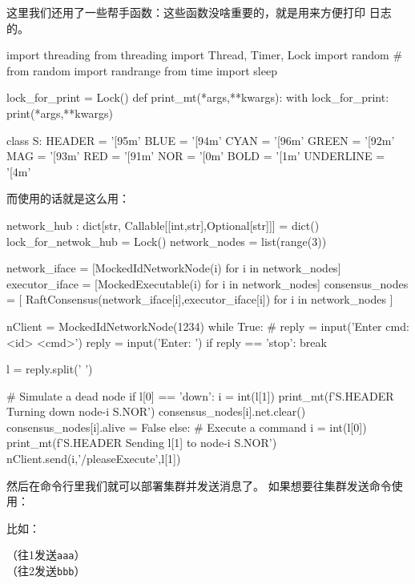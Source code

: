 \begin{tcolorbox}
   这里我们还用了一些帮手函数：这些函数没啥重要的，就是用来方便打印
  日志的。
  \begin{simplepy}
import threading
from threading import Thread, Timer, Lock
import random
# from random import randrange
from time import sleep

lock_for_print = Lock()
def print_mt(*args,**kwargs):
    with lock_for_print:
        print(*args,**kwargs)

class S:
    HEADER = '[95m'
    BLUE = '[94m'
    CYAN = '[96m'
    GREEN = '[92m'
    MAG = '[93m'
    RED = '[91m'
    NOR = '[0m'
    BOLD = '[1m'
    UNDERLINE = '[4m'
  \end{simplepy}
\end{tcolorbox}
而使用的话就是这么用：
\begin{simplepy}
network_hub : dict[str, Callable[[int,str],Optional[str]]] = dict()
lock_for_netwok_hub = Lock()
network_nodes = list(range(3))

network_iface = [MockedIdNetworkNode(i) for i in network_nodes]
executor_iface = [MockedExecutable(i) for i in network_nodes]
consensus_nodes = [
    RaftConsensus(network_iface[i],executor_iface[i]) for i in network_nodes
]

nClient = MockedIdNetworkNode(1234)
while True:
    # reply = input('Enter cmd: <id> <cmd>')
    reply = input('Enter: ')
    if reply == 'stop': break

    l = reply.split(' ')

    # Simulate a dead node
    if l[0] == 'down':
        i = int(l[1])
        print_mt(f'{S.HEADER} Turning down node-{i} {S.NOR}')
        consensus_nodes[i].net.clear()
        consensus_nodes[i].alive = False
    else:
        # Execute a command
        i = int(l[0])
        print_mt(f'{S.HEADER} Sending {l[1]} to node-{i} {S.NOR}')
        nClient.send(i,'/pleaseExecute',l[1])
  
\end{simplepy}

然后在命令行里我们就可以部署集群并发送消息了。 如果想要往集群发送命令使用：
\begin{center}
   
\end{center}
比如：
\begin{center}
    （往1发送\texttt{aaa}） \\
    （往2发送\texttt{bbb}）\\
\end{center}

